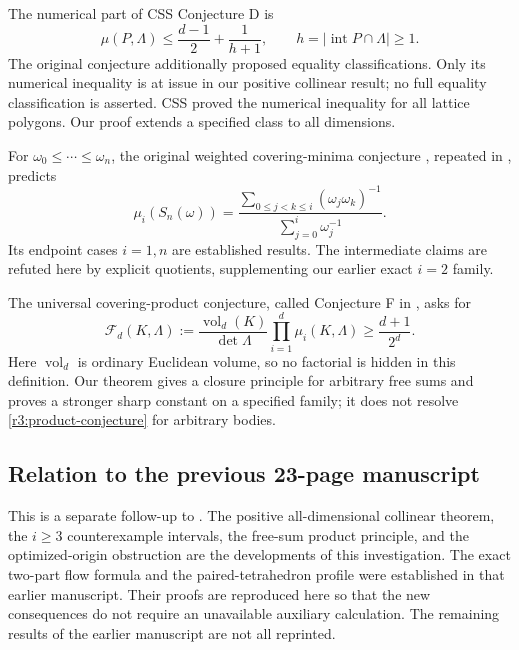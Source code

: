 \documentclass[11pt,a4paper]{article}
\theoremstyle{remark}\newtheorem{remark}[theorem]{Remark}
\DeclareMathOperator{\vol}{vol}
\DeclareMathOperator{\inter}{int}
\begin{document}
The numerical part of CSS Conjecture D \cite{CSS} is
\begin{equation}\label{r3:conjectureD}
 \mu(P,\Lambda)\le\frac{d-1}{2}+\frac1{h+1},
 \qquad h=|\inter P\cap\Lambda|\ge1.
\end{equation}
The original conjecture additionally proposed equality classifications.
Only its numerical inequality is at issue in our positive collinear
result; no full equality classification is asserted. CSS proved the
numerical inequality for all lattice polygons. Our proof extends a
specified class to all dimensions.

For $\omega_0\le\cdots\le\omega_n$, the original weighted
covering-minima conjecture \cite[Conjecture 5.3]{CSS}, repeated in
\cite[Conjecture 5.3]{Krivokuca}, predicts
\begin{equation}\label{r3:weighted-conjecture}
 \mu_i(S_n(\omega))=
 \frac{\sum_{0\le j<k\le i}(\omega_j\omega_k)^{-1}}
      {\sum_{j=0}^i\omega_j^{-1}}.
\end{equation}
Its endpoint cases $i=1,n$ are established results. The intermediate
claims are refuted here by explicit quotients, supplementing our
earlier exact $i=2$ family.

The universal covering-product conjecture, called Conjecture F in
\cite{CSS}, asks for
\begin{equation}\label{r3:product-conjecture}
 \mathcal F_d(K,\Lambda):=
 \frac{\vol_d(K)}{\det\Lambda}\prod_{i=1}^d\mu_i(K,\Lambda)
 \ge\frac{d+1}{2^d}.
\end{equation}
Here $\vol_d$ is ordinary Euclidean volume, so no factorial is hidden
in this definition. Our theorem gives a closure principle for arbitrary
free sums and proves a stronger sharp constant on a specified family;
it does not resolve \eqref{r3:product-conjecture} for arbitrary bodies.

\subsection{Relation to the previous 23-page manuscript}

This is a separate follow-up to \cite{TransferTwo}. The positive
all-dimensional collinear theorem, the $i\ge3$ counterexample intervals,
the free-sum product principle, and the optimized-origin obstruction
are the developments of this investigation. The exact two-part flow
formula and the paired-tetrahedron profile were established in that
earlier manuscript. Their proofs are reproduced here so that the new
consequences do not require an unavailable auxiliary calculation.
The remaining results of the earlier manuscript are not all reprinted.
\end{document}

